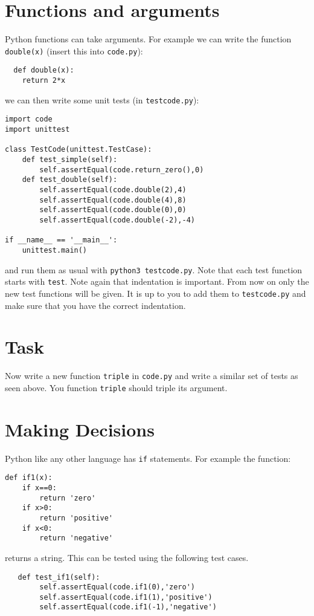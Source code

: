 \documentclass{paper}
\begin{document}
\section*{Functions and arguments}
Python functions can take arguments. For example we can write the
function {\tt double(x)} (insert this into {\tt code.py}):
\begin{lstlisting}
  def double(x):
    return 2*x
\end{lstlisting}
we can then write some unit tests (in {\tt testcode.py}):
\begin{lstlisting}
import code
import unittest

class TestCode(unittest.TestCase):
    def test_simple(self):
        self.assertEqual(code.return_zero(),0)
    def test_double(self):
        self.assertEqual(code.double(2),4)
        self.assertEqual(code.double(4),8)
        self.assertEqual(code.double(0),0)
        self.assertEqual(code.double(-2),-4)

if __name__ == '__main__':
    unittest.main()

  \end{lstlisting} and run them as usual with {\tt python3 testcode.py}. Note that each test
  function starts with {\tt test}. Note again that indentation is
  important. From now on only the new test functions will be given. It is up
  to you to add them to {\tt testcode.py} and make sure that you have the
  correct indentation.

\section{Task}
Now write a new function {\tt triple} in {\tt code.py} and write a
similar set of tests as seen above. You function {\tt triple} should triple
its argument.

\section*{Making Decisions}
Python like any other language has {\tt if} statements. For example
the function:
\begin{lstlisting}
def if1(x):
    if x==0:
        return 'zero'
    if x>0:
        return 'positive'
    if x<0:
        return 'negative'
\end{lstlisting}
returns a string. This can be tested using the following test cases.
\begin{lstlisting}
   def test_if1(self):
        self.assertEqual(code.if1(0),'zero')
        self.assertEqual(code.if1(1),'positive')
        self.assertEqual(code.if1(-1),'negative')
\end{lstlisting}
\end{document}
